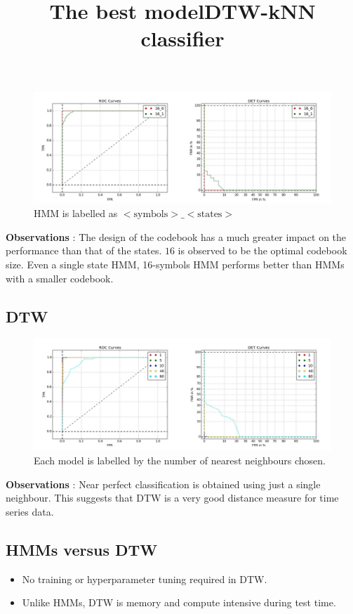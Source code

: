 \documentclass{article}
\begin{document}
\begin{figure}[h!]
\centering
\title{The best model}
\includegraphics[width=\textwidth]{isolated_digits/plots/hmm/roc_det_final.jpg}
\caption{HMM is labelled as $<\text{symbols}>\_<\text{states}>$}
\end{figure}

\newpage
\textbf{Observations} : The design of the codebook has a much greater impact on the performance than that of the states. $16$ is observed to be the optimal codebook size. Even a single state HMM, 16-symbols HMM performs better than HMMs with a smaller codebook. 

\subsection{DTW}

\begin{figure}[h!]
\centering
\title{DTW-kNN classifier}
\includegraphics[width=\textwidth]{isolated_digits/plots/dtw/roc_det.jpg}
\caption{Each model is labelled by the number of nearest neighbours chosen.}
\end{figure}

\textbf{Observations} : Near perfect classification is obtained using just a single neighbour. This suggests that DTW is a very good distance measure for time series data.

\subsection{HMMs versus DTW}
\begin{itemize}
	\item No training or hyperparameter tuning required in DTW.
	\item Unlike HMMs, DTW is memory and compute intensive during test time.
	
\end{itemize}
\end{document}
